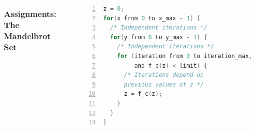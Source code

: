 \documentclass[10pt, compress, aspectratio=169]{beamer}
\begin{document}
\begin{frame}[fragile]
    \begin{columns}[T,onlytextwidth]
    \frametitle{Assignments: The Mandelbrot Set}
        \begin{center}
            \includegraphics[width=.85\textwidth]{mandelbrot}
        \end{center}

        \begin{center}
            \begin{lstlisting}[language=C, basicstyle=\ttfamily\scriptsize, numbers=left,
                   frame=no, showspaces=false, showstringspaces=false,
                   numberstyle=\tiny,
                   xleftmargin=0.5cm,
                   keywords={%
                       DATATYPE, pthread_t, pthread_create,
                       pthread_join, task_function, NULL, int, main,
                       void, printf, return, pthread_mutex_t,
                       pthread_attr_t, pthread_attr_init,
                       MAX_THREADS, SIZE, char, struct, malloc,
                       MIN, pthread_mutex_lock, pthread_mutex_unlock,
                       pthread_exit, from, to, and, for%
                       },
                   otherkeywords={::, \#pragma, \#include, <<<,>>>, \&, \*, +, -, /, [, ], >, <}
                   ]
z = 0;
for(x from 0 to x_max - 1) {
  /* Independent iterations */
  for(y from 0 to y_max - 1) {
    /* Independent iterations */
    for (iteration from 0 to iteration_max,
         and f_c(z) < limit) {
      /* Iterations depend on
      previous values of z */
      z = f_c(z);
    }
  }
}
            \end{lstlisting}
        \end{center}
    \end{columns}
\end{frame}
\end{document}
